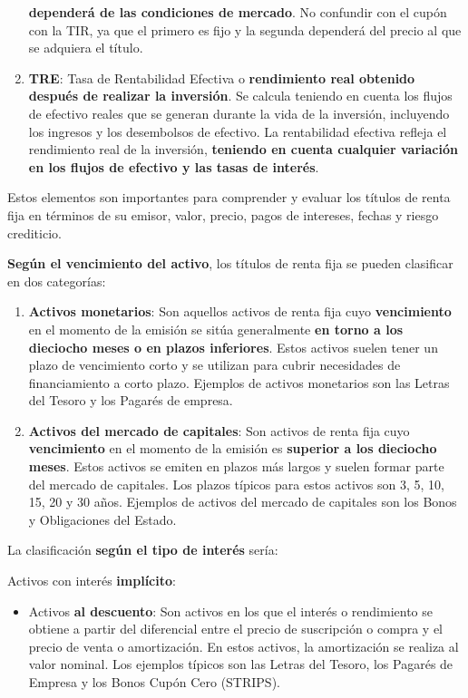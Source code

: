 \documentclass[
  letterpaper,
  DIV=11,
  numbers=noendperiod]{scrreprt}
\providecommand{\tightlist}{%
  \setlength{\itemsep}{0pt}\setlength{\parskip}{0pt}}\usepackage{longtable,booktabs,array}
\begin{document}
\begin{tcolorbox}
\begin{enumerate}
  \textbf{dependerá de las condiciones de mercado}. No confundir con el
  cupón con la TIR, ya que el primero es fijo y la segunda dependerá del
  precio al que se adquiera el título.
\item
  \textbf{TRE}: Tasa de Rentabilidad Efectiva o \textbf{rendimiento real
  obtenido después de realizar la inversión}. Se calcula teniendo en
  cuenta los flujos de efectivo reales que se generan durante la vida de
  la inversión, incluyendo los ingresos y los desembolsos de efectivo.
  La rentabilidad efectiva refleja el rendimiento real de la inversión,
  \textbf{teniendo en cuenta cualquier variación en los flujos de
  efectivo y las tasas de interés}.
\end{enumerate}

Estos elementos son importantes para comprender y evaluar los títulos de
renta fija en términos de su emisor, valor, precio, pagos de intereses,
fechas y riesgo crediticio.

\textbf{Según el vencimiento del activo}, los títulos de renta fija se
pueden clasificar en dos categorías:

\begin{enumerate}
\def\labelenumi{\arabic{enumi}.}
\item
  \textbf{Activos monetarios}: Son aquellos activos de renta fija cuyo
  \textbf{vencimiento} en el momento de la emisión se sitúa generalmente
  \textbf{en torno a los dieciocho meses o en plazos inferiores}. Estos
  activos suelen tener un plazo de vencimiento corto y se utilizan para
  cubrir necesidades de financiamiento a corto plazo. Ejemplos de
  activos monetarios son las Letras del Tesoro y los Pagarés de empresa.
\item
  \textbf{Activos del mercado de capitales}: Son activos de renta fija
  cuyo \textbf{vencimiento} en el momento de la emisión es
  \textbf{superior a los dieciocho meses}. Estos activos se emiten en
  plazos más largos y suelen formar parte del mercado de capitales. Los
  plazos típicos para estos activos son 3, 5, 10, 15, 20 y 30 años.
  Ejemplos de activos del mercado de capitales son los Bonos y
  Obligaciones del Estado.
\end{enumerate}

La clasificación \textbf{según el tipo de interés} sería:

Activos con interés \textbf{implícito}:

\begin{itemize}
\tightlist
\item
  Activos \textbf{al descuento}: Son activos en los que el interés o
  rendimiento se obtiene a partir del diferencial entre el precio de
  suscripción o compra y el precio de venta o amortización. En estos
  activos, la amortización se realiza al valor nominal. Los ejemplos
  típicos son las Letras del Tesoro, los Pagarés de Empresa y los Bonos
  Cupón Cero (STRIPS).
\end{itemize}


\end{tcolorbox}
\end{document}
